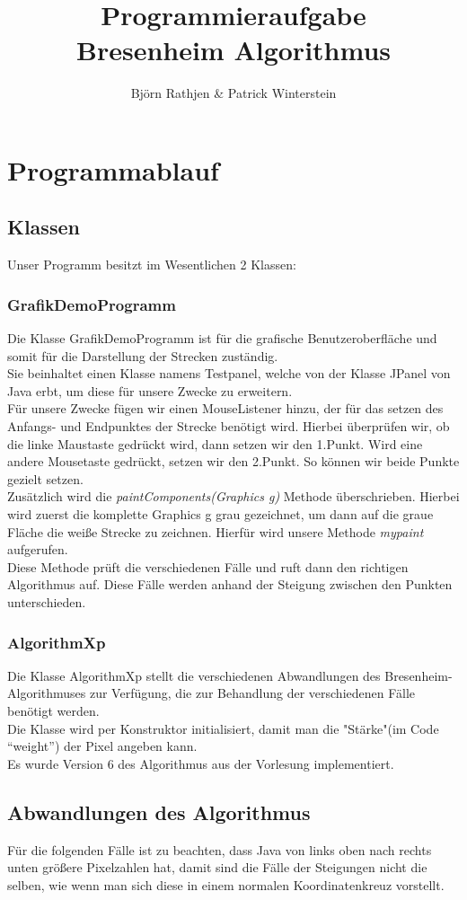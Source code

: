 \documentclass[a4paper,10pt]{article}
\title{Programmieraufgabe \\ Bresenheim Algorithmus}
\author{Björn Rathjen \& Patrick Winterstein}
\begin{document}
\maketitle
\newpage
\tableofcontents
\section{Programmablauf}
\subsection{Klassen}
Unser Programm besitzt im Wesentlichen 2 Klassen:
\subsubsection{GrafikDemoProgramm}
Die Klasse GrafikDemoProgramm ist für die grafische Benutzeroberfläche und somit für die Darstellung der Strecken zuständig.\\Sie beinhaltet einen Klasse namens Testpanel, welche von der Klasse JPanel von Java erbt, um diese für unsere Zwecke zu erweitern.\\Für unsere Zwecke fügen wir einen MouseListener hinzu, der für das setzen des Anfangs- und Endpunktes der Strecke benötigt wird. Hierbei überprüfen wir, ob die linke Maustaste gedrückt wird, dann setzen wir den 1.Punkt. Wird eine andere Mousetaste gedrückt, setzen wir den 2.Punkt. So können wir beide Punkte gezielt setzen.\\Zusätzlich wird die \textit{paintComponents(Graphics g)} Methode überschrieben. Hierbei wird zuerst die komplette Graphics g grau gezeichnet, um dann auf die graue Fläche die weiße Strecke zu zeichnen. Hierfür wird unsere Methode \textit{mypaint} aufgerufen.\\Diese Methode prüft die verschiedenen Fälle und ruft dann den richtigen Algorithmus auf. Diese Fälle werden anhand der Steigung zwischen den Punkten unterschieden.
\subsubsection{AlgorithmXp}
Die Klasse AlgorithmXp stellt die verschiedenen Abwandlungen des Bresenheim-Algorithmuses zur Verfügung, die zur Behandlung der verschiedenen Fälle benötigt werden.\\Die Klasse wird per Konstruktor initialisiert, damit man die "Stärke"(im Code ``weight'') der Pixel angeben kann.\\ Es wurde Version 6 des Algorithmus aus der Vorlesung implementiert.
\subsection{Abwandlungen des Algorithmus}
Für die folgenden Fälle ist zu beachten, dass Java von links oben nach rechts unten größere Pixelzahlen hat, damit sind die Fälle der Steigungen nicht die selben, wie wenn man sich diese in einem normalen Koordinatenkreuz vorstellt.
\newpage
\end{document}
